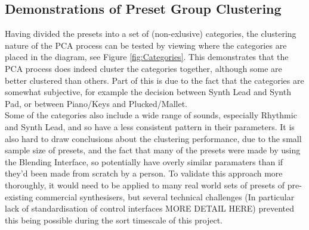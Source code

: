 \documentclass[11pt, oneside]{report}   	%
\begin{document}
\subsection{Demonstrations of Preset Group Clustering}
Having divided the presets into a set of (non-exlusive) categories, the clustering nature of the PCA process can be tested by viewing where the categories are placed in the diagram, see Figure \ref{fig:Categories}. This demonstrates that the PCA process does indeed cluster the categories together, although some are better clustered than others. Part of this is due to the fact that the categories are somewhat subjective, for example the decision between Synth Lead and Synth Pad, or between Piano/Keys and Plucked/Mallet.\\
Some of the categories also include a wide range of sounds, especially Rhythmic and Synth Lead, and so have a less consistent pattern in their parameters.
It is also hard to draw conclusions about the clustering performance, due to the small sample size of presets, and the fact that many of the presets were made by using the Blending Interface, so potentially have overly similar paramaters than if they'd been made from scratch by a person. To validate this approach more thoroughly, it would need to be applied to many real world sets of presets of pre-existing commercial synthesisers, but several technical challenges (In particular lack of standardisation of control interfaces MORE DETAIL HERE) prevented this being possible during the sort timescale of this project.
\end{document}

